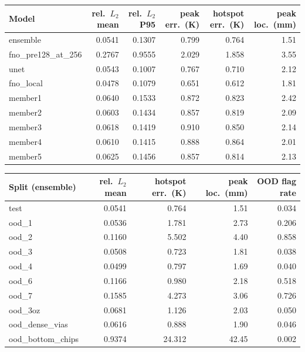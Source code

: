 \begin{tabular}{lrrrrr}
\hline
Model & rel.\ $L_2$ mean & rel.\ $L_2$ P95 & peak err.\ (K) & hotspot err.\ (K) & peak loc.\ (mm) \\
\hline
ensemble & 0.0541 & 0.1307 & 0.799 & 0.764 & 1.51 \\
fno\_pre128\_at\_256 & 0.2767 & 0.9555 & 2.029 & 1.858 & 3.55 \\
unet & 0.0543 & 0.1007 & 0.767 & 0.710 & 2.12 \\
fno\_local & 0.0478 & 0.1079 & 0.651 & 0.612 & 1.81 \\
member1 & 0.0640 & 0.1533 & 0.872 & 0.823 & 2.42 \\
member2 & 0.0603 & 0.1434 & 0.857 & 0.819 & 2.09 \\
member3 & 0.0618 & 0.1419 & 0.910 & 0.850 & 2.14 \\
member4 & 0.0610 & 0.1415 & 0.888 & 0.864 & 2.01 \\
member5 & 0.0625 & 0.1456 & 0.857 & 0.814 & 2.13 \\
\hline
\end{tabular}

\begin{tabular}{lrrrr}
\hline
Split (ensemble) & rel.\ $L_2$ mean & hotspot err.\ (K) & peak loc.\ (mm) & OOD flag rate \\
\hline
test & 0.0541 & 0.764 & 1.51 & 0.034 \\
ood\_1 & 0.0536 & 1.781 & 2.73 & 0.206 \\
ood\_2 & 0.1160 & 5.502 & 4.40 & 0.858 \\
ood\_3 & 0.0508 & 0.723 & 1.81 & 0.038 \\
ood\_4 & 0.0499 & 0.797 & 1.69 & 0.040 \\
ood\_6 & 0.1166 & 0.980 & 2.18 & 0.518 \\
ood\_7 & 0.1585 & 4.273 & 3.06 & 0.726 \\
ood\_3oz & 0.0681 & 1.126 & 2.03 & 0.050 \\
ood\_dense\_vias & 0.0616 & 0.888 & 1.90 & 0.046 \\
ood\_bottom\_chips & 0.9374 & 24.312 & 42.45 & 0.002 \\
\hline
\end{tabular}
